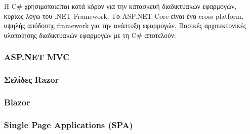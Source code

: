 Η C\# χρησιμοποιείται κατά κόρον για την κατασκευή διαδικτυακών εφαρμογών, κυρίως λόγω του .NET Framework.
Το ASP.NET Core είναι ένα cross-platform, υψηλής απόδοσης framework για την ανάπτυξη εφαρμογών.
Βασικές αρχιτεκτονικές υλοποίησης διαδικτυακών εφαρμογών με τη C\#  αποτελούν:

\subsubsection*{ASP.NET MVC}


\subsubsection*{Σελίδες Razor}


\subsubsection*{Blazor}


\subsubsection*{Single Page Applications (SPA)}
